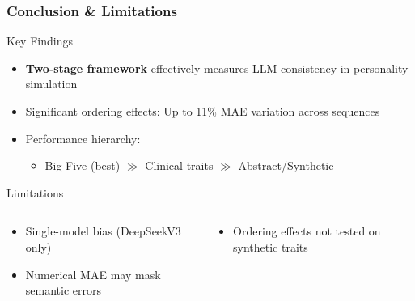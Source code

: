 \documentclass[12pt,pdf,hyperref={unicode}]{beamer}
\begin{document}
\begin{frame}
\frametitle{Conclusion \& Limitations}

\begin{block}{Key Findings}
\begin{itemize}
    \item \textbf{Two-stage framework} effectively measures LLM consistency in personality simulation
    \item \alert{Significant ordering effects}: Up to 11\% MAE variation across sequences
    \item Performance hierarchy:
    \begin{itemize}
        \item Big Five (best) $\gg$ Clinical traits $\gg$ Abstract/Synthetic
    \end{itemize}
\end{itemize}
\end{block}

\begin{block}{Limitations}
\begin{columns}
\begin{column}{0.5\textwidth}
\begin{itemize}
    \item Single-model bias (DeepSeekV3 only)
    \item Numerical MAE may mask semantic errors
\end{itemize}
\end{column}
\begin{column}{0.5\textwidth}
\begin{itemize}
    \item Ordering effects not tested on synthetic traits
\end{itemize}
\end{column}
\end{columns}
\end{block}

\end{frame}
\end{document}
